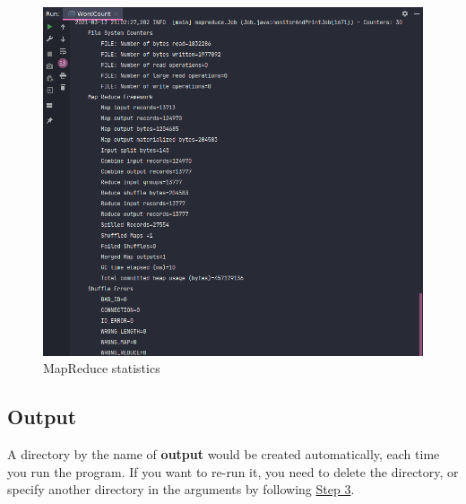 \documentclass[10pt]{report}
\begin{document}
\begin{figure}[h]
        \includegraphics[width=15cm]{MapReduceTask.png}
        \centering
        \caption{MapReduce statistics}
        \centering
\end{figure}
\clearpage

\subsection{Output}
A directory by the name of \textbf{output} would be created automatically, each time you run the program. If you want to re-run it,
you need to delete the directory, or specify another directory in the arguments by following \hyperref[step3]{Step 3}.
\end{document}
